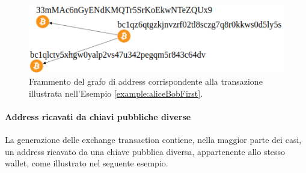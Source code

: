 \begin{figure}
\centering
\includegraphics[scale=0.43]{images/exampleWithGraph/exchange-transaction-alice-bob.png}
  \caption{Frammento del grafo di address corrispondente alla transazione illustrata nell’Esempio \ref{example:aliceBobFirst}.\label{fig:alicebobgraphaddress}}
\end{figure}

\paragraph*{Address ricavati da chiavi pubbliche diverse} La generazione delle exchange transaction contiene, nella maggior parte dei casi, un address ricavato da una chiave pubblica diversa, appartenente allo stesso wallet, come illustrato nel seguente esempio.

